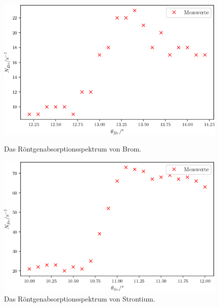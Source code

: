 \begin{figure}
\centering
\includegraphics[width=\linewidth-70pt,height=\textheight-70pt,keepaspectratio]{content/images/Br.png}
\caption{Das Röntgenabsorptionsspektrum von Brom.}
\label{fig:Br}

\includegraphics[width=\linewidth-70pt,height=\textheight-70pt,keepaspectratio]{content/images/Sr.png}
\caption{Das Röntgenabsorptionsspektrum von Strontium.}
\label{fig:Sr}
\end{figure}


